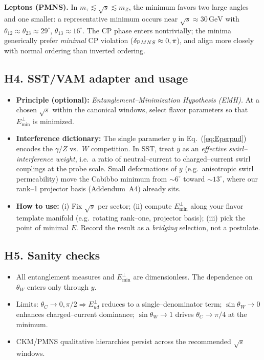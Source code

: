 \documentclass[11pt]{article}
\begin{document}
      \textbf{Leptons (PMNS).}
      In $m_\tau\lesssim\sqrt s\lesssim m_Z$, the minimum favors two large angles and one smaller: a representative minimum occurs near $\sqrt s\approx 30\,\mathrm{GeV}$ with $\theta_{12}\approx\theta_{23}\approx 29^{\circ}$, $\theta_{13}\approx 16^{\circ}$. The CP phase enters nontrivially; the minima generically prefer \emph{minimal} CP violation ($\delta_{\textrm PMNS}\approx 0,\pi$), and align more closely with normal ordering than inverted ordering.

  \subsection*{H4. SST/VAM adapter and usage}

      \begin{itemize}
      \item \textbf{Principle (optional):} \emph{Entanglement–Minimization Hypothesis (EMH).} At a chosen $\sqrt s$ within the canonical windows, select flavor parameters so that $E^{\perp}_{\min}$ is minimized.
      \item \textbf{Interference dictionary:} The single parameter $y$ in Eq.~(\ref{eq:Eperpud}) encodes the $\gamma/Z$ vs.\ $W$ competition. In SST, treat $y$ as an \emph{effective swirl–interference weight}, i.e.\ a ratio of neutral–current to charged–current swirl couplings at the probe scale. Small deformations of $y$ (e.g.\ anisotropic swirl permeability) move the Cabibbo minimum from $\sim 6^{\circ}$ toward $\sim 13^{\circ}$, where our rank–1 projector basis (Addendum~A4) already sits.
      \item \textbf{How to use:} (i) Fix $\sqrt s$ per sector; (ii) compute $E^{\perp}_{\min}$ along your flavor template manifold (e.g.\ rotating rank–one, projector basis); (iii) pick the point of minimal $E$. Record the result as a \emph{bridging} selection, not a postulate.
      \end{itemize}

  \subsection*{H5. Sanity checks}

      \begin{itemize}
      \item All entanglement measures and $E^{\perp}_{\min}$ are dimensionless. The dependence on $\theta_W$ enters only through $y$.
      \item Limits: $\theta_C\to 0,\pi/2 \Rightarrow E^{\perp}_{ud}$ reduces to a single–denominator term; $\sin\theta_W\to 0$ enhances charged–current dominance; $\sin\theta_W\to 1$ drives $\theta_C\to \pi/4$ at the minimum.
      \item CKM/PMNS qualitative hierarchies persist across the recommended $\sqrt s$ windows.
      \end{itemize}
\end{document}
